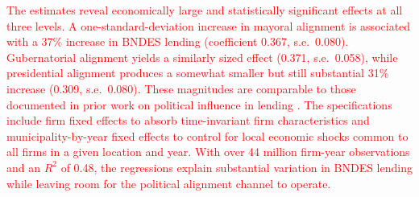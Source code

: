 \documentclass{article}
\begin{document}
\textcolor{red}{The estimates reveal economically large and statistically significant effects at all three levels. A one-standard-deviation increase in mayoral alignment is associated with a 37\% increase in BNDES lending (coefficient 0.367, s.e.~0.080). Gubernatorial alignment yields a similarly sized effect (0.371, s.e.~0.058), while presidential alignment produces a somewhat smaller but still substantial 31\% increase (0.309, s.e.~0.080). These magnitudes are comparable to those documented in prior work on political influence in lending \citep{carvalho2014real, claessens2008political}. The specifications include firm fixed effects to absorb time-invariant firm characteristics and municipality-by-year fixed effects to control for local economic shocks common to all firms in a given location and year. With over 44 million firm-year observations and an $R^2$ of 0.48, the regressions explain substantial variation in BNDES lending while leaving room for the political alignment channel to operate.}
\end{document}
